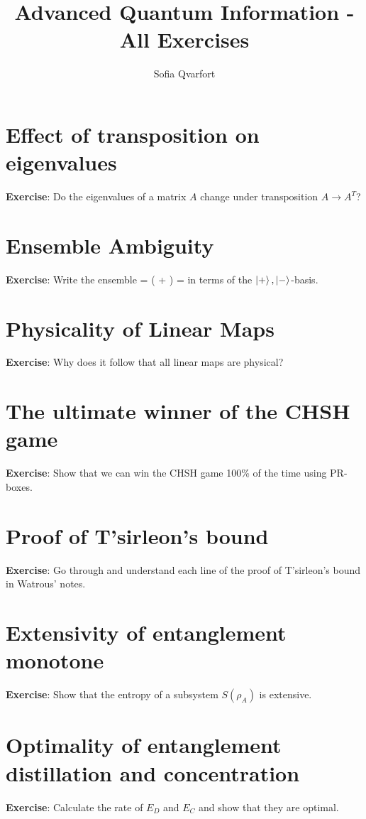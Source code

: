 


\title{Advanced Quantum Information - All Exercises}
\author{Sofia Qvarfort}
\maketitle
\tableofcontents

\newpage

\section{Effect of transposition on eigenvalues}
\textbf{Exercise}: Do the eigenvalues of a matrix $A$ change under transposition $A \rightarrow A^T$?

\section{Ensemble Ambiguity}
\textbf{Exercise}: Write the ensemble 
\beq
\rho =  \left(  +  \right) = 
\eeq
in terms of the $\ket{+}, \ket{-}$-basis. 

\section{Physicality of Linear Maps}
\textbf{Exercise}: Why does it follow that all linear maps are physical? 

\section{The ultimate winner of the CHSH game}
\textbf{Exercise}: Show that we can win the CHSH game 100\% of the time using PR-boxes. 

\section{Proof of T'sirleon's bound}
\textbf{Exercise}: Go through and understand each line of the proof of T'sirleon's bound in Watrous' notes. 

\section{Extensivity of entanglement monotone}
\textbf{Exercise}: Show that the entropy of a subsystem $S(\rho_A)$ is extensive. 

\section{Optimality of entanglement distillation and concentration}
\textbf{Exercise}:  Calculate the rate of $E_D$ and $E_C$ and show that they are optimal. 

